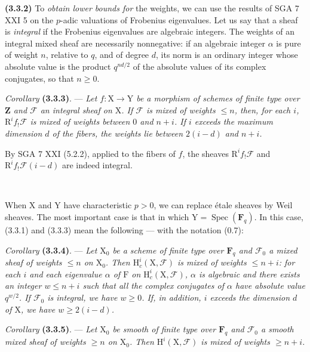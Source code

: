 \documentclass[11pt,leqno]{article}
\newcommand{\Page}[1]{\ifvmode\noindent\else\unskip\ \fi{\footnotesize\textcolor{gray}{[p.\,#1]}}\ \ignorespaces}
\begin{document}
\textbf{(3.3.2)} To \textit{obtain lower bounds for} the weights, we can use the results of SGA 7 XXI 5 on the \(p\)-adic valuations of Frobenius eigenvalues. Let us say that a sheaf is \textit{integral} if the Frobenius eigenvalues are algebraic integers. The weights of an integral mixed sheaf are necessarily nonnegative: if an algebraic integer \(\alpha\) is pure of weight \(n\), relative to \(q\), and of degree \(d\), its norm is an ordinary integer whose absolute value is the product \(q^{nd/2}\) of the absolute values of its complex conjugates, so that \(n\geq0\).

\textit{Corollary} \textbf{(3.3.3)}. — \textit{Let \(f:\mathrm{X}\to\mathrm{Y}\) be a morphism of schemes of finite type over \(\mathbf{Z}\) and \(\mathscr{F}\) an integral sheaf on \(\mathrm{X}\). If \(\mathscr{F}\) is mixed of weights \(\leq n\), then, for each \(i\), \(\mathrm{R}^if_!\mathscr{F}\) is mixed of weights between \(0\) and \(n+i\). If \(i\) exceeds the maximum dimension \(d\) of the fibers, the weights lie between \(2(i-d)\) and \(n+i\).}

By SGA 7 XXI (5.2.2), applied to the fibers of \(f\), the sheaves \(\mathrm{R}^if_!\mathscr{F}\) and \(\mathrm{R}^if_!\mathscr{F}(i-d)\) are indeed integral.

\Page{206}

When \(\mathrm{X}\) and \(\mathrm{Y}\) have characteristic \(p>0\), we can replace étale sheaves by Weil sheaves. The most important case is that in which \(\mathrm{Y}=\operatorname{Spec}(\mathbf{F}_q)\). In this case, (3.3.1) and (3.3.3) mean the following — with the notation (0.7):

\textit{Corollary} \textbf{(3.3.4)}. — \textit{Let \(\mathrm{X}_0\) be a scheme of finite type over \(\mathbf{F}_q\) and \(\mathscr{F}_0\) a mixed sheaf of weights \(\leq n\) on \(\mathrm{X}_0\). Then \(\mathrm{H}_c^i(\mathrm{X},\mathscr{F})\) is mixed of weights \(\leq n+i\): for each \(i\) and each eigenvalue \(\alpha\) of \(\mathrm{F}\) on \(\mathrm{H}_c^i(\mathrm{X},\mathscr{F})\), \(\alpha\) is algebraic and there exists an integer \(w\leq n+i\) such that all the complex conjugates of \(\alpha\) have absolute value \(q^{w/2}\). If \(\mathscr{F}_0\) is integral, we have \(w\geq0\). If, in addition, \(i\) exceeds the dimension \(d\) of \(\mathrm{X}\), we have \(w\geq2(i-d)\).}

\textit{Corollary} \textbf{(3.3.5)}. — \textit{Let \(\mathrm{X}_0\) be smooth of finite type over \(\mathbf{F}_q\) and \(\mathscr{F}_0\) a smooth mixed sheaf of weights \(\geq n\) on \(\mathrm{X}_0\). Then \(\mathrm{H}^i(\mathrm{X},\mathscr{F})\) is mixed of weights \(\geq n+i\).}
\end{document}
